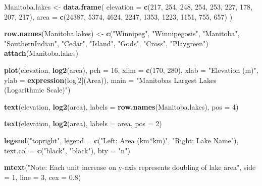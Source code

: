 \documentclass[
]{article}
\newenvironment{Shaded}{\begin{snugshade}}{\end{snugshade}}
\newcommand{\AttributeTok}[1]{\textcolor[rgb]{0.13,0.29,0.53}{#1}}
\newcommand{\DecValTok}[1]{\textcolor[rgb]{0.00,0.00,0.81}{#1}}
\newcommand{\FloatTok}[1]{\textcolor[rgb]{0.00,0.00,0.81}{#1}}
\newcommand{\FunctionTok}[1]{\textcolor[rgb]{0.13,0.29,0.53}{\textbf{#1}}}
\newcommand{\NormalTok}[1]{#1}
\newcommand{\OtherTok}[1]{\textcolor[rgb]{0.56,0.35,0.01}{#1}}
\newcommand{\StringTok}[1]{\textcolor[rgb]{0.31,0.60,0.02}{#1}}
\begin{document}
\begin{Shaded}
\begin{Highlighting}[]
\NormalTok{Manitoba.lakes }\OtherTok{\textless{}{-}} \FunctionTok{data.frame}\NormalTok{(}
  \AttributeTok{elevation =} \FunctionTok{c}\NormalTok{(}\DecValTok{217}\NormalTok{, }\DecValTok{254}\NormalTok{, }\DecValTok{248}\NormalTok{, }\DecValTok{254}\NormalTok{, }\DecValTok{253}\NormalTok{, }\DecValTok{227}\NormalTok{, }\DecValTok{178}\NormalTok{, }\DecValTok{207}\NormalTok{, }\DecValTok{217}\NormalTok{),}
  \AttributeTok{area =} \FunctionTok{c}\NormalTok{(}\DecValTok{24387}\NormalTok{, }\DecValTok{5374}\NormalTok{, }\DecValTok{4624}\NormalTok{, }\DecValTok{2247}\NormalTok{, }\DecValTok{1353}\NormalTok{, }\DecValTok{1223}\NormalTok{, }\DecValTok{1151}\NormalTok{, }\DecValTok{755}\NormalTok{, }\DecValTok{657}\NormalTok{)}
\NormalTok{)}

\FunctionTok{row.names}\NormalTok{(Manitoba.lakes) }\OtherTok{\textless{}{-}} \FunctionTok{c}\NormalTok{(}\StringTok{"Winnipeg"}\NormalTok{, }\StringTok{"Winnipegosis"}\NormalTok{, }\StringTok{"Manitoba"}\NormalTok{, }
                               \StringTok{"SouthernIndian"}\NormalTok{, }\StringTok{"Cedar"}\NormalTok{, }\StringTok{"Island"}\NormalTok{, }
                               \StringTok{"Gods"}\NormalTok{, }\StringTok{"Cross"}\NormalTok{, }\StringTok{"Playgreen"}\NormalTok{)}
\FunctionTok{attach}\NormalTok{(Manitoba.lakes)}

\FunctionTok{plot}\NormalTok{(elevation, }\FunctionTok{log2}\NormalTok{(area), }\AttributeTok{pch =} \DecValTok{16}\NormalTok{, }\AttributeTok{xlim =} \FunctionTok{c}\NormalTok{(}\DecValTok{170}\NormalTok{, }\DecValTok{280}\NormalTok{),}
     \AttributeTok{xlab =} \StringTok{"Elevation (m)"}\NormalTok{, }\AttributeTok{ylab =} \FunctionTok{expression}\NormalTok{(log[}\DecValTok{2}\NormalTok{](Area)),}
     \AttributeTok{main =} \StringTok{"Manitoba\textquotesingle{}s Largest Lakes (Logarithmic Scale)"}\NormalTok{)}

\FunctionTok{text}\NormalTok{(elevation, }\FunctionTok{log2}\NormalTok{(area), }\AttributeTok{labels =} \FunctionTok{row.names}\NormalTok{(Manitoba.lakes), }\AttributeTok{pos =} \DecValTok{4}\NormalTok{)}


\FunctionTok{text}\NormalTok{(elevation, }\FunctionTok{log2}\NormalTok{(area), }\AttributeTok{labels =}\NormalTok{ area, }\AttributeTok{pos =} \DecValTok{2}\NormalTok{)}

\FunctionTok{legend}\NormalTok{(}\StringTok{"topright"}\NormalTok{, }
       \AttributeTok{legend =} \FunctionTok{c}\NormalTok{(}\StringTok{"Left: Area (km*km)"}\NormalTok{, }\StringTok{"Right: Lake Name"}\NormalTok{),}
       \AttributeTok{text.col =} \FunctionTok{c}\NormalTok{(}\StringTok{"black"}\NormalTok{, }\StringTok{"black"}\NormalTok{), }\AttributeTok{bty =} \StringTok{"n"}\NormalTok{)}

\FunctionTok{mtext}\NormalTok{(}\StringTok{"Note: Each unit increase on y{-}axis represents doubling of lake area"}\NormalTok{, }
      \AttributeTok{side =} \DecValTok{1}\NormalTok{, }\AttributeTok{line =} \DecValTok{3}\NormalTok{, }\AttributeTok{cex =} \FloatTok{0.8}\NormalTok{)}
\end{Highlighting}
\end{Shaded}
\end{document}
